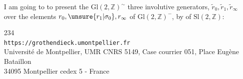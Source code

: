 I am going to  to present the  
$\mathrm{Gl}(2,\mathbb Z)^{\sim}$  three involutive generators,
 $\widetilde r_0,\widetilde r_1,\widetilde r_\infty$ over the elements
$r_0,\unsure{r_1|\sigma_0},r_\infty$ of $\mathrm{Gl}(2,\mathbb Z)^{-}$, by   of $\mathrm{Sl}(2,\mathbb Z)$:


\begin{center}
234\\
\texttt{https://grothendieck.umontpellier.fr}\\
Université de Montpellier, UMR CNRS 5149, Case courrier 051, Place Eugène Bataillon\\
34095 Montpellier cedex 5 - France
\end{center}